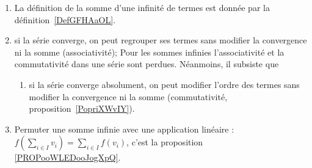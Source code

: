\begin{description}
\begin{enumerate}
    \item
        La définition de la somme d'une infinité de termes est donnée par la définition~\ref{DefGFHAaOL}.
  \item
      si la série converge, on peut regrouper ses termes sans modifier la convergence ni la somme (associativité);
    Pour les sommes infinies l'associativité et la commutativité dans une série sont perdues. Néanmoins, il subsiste que
  \begin{enumerate}
  \item
      si la série converge absolument, on peut modifier l'ordre des termes sans modifier la convergence ni la somme (commutativité, proposition~\ref{PopriXWvIY}).
  \end{enumerate}
  \item Permuter une somme infinie avec une application linéaire : \( f(\sum_{i\in I}v_i)=\sum_{i\in I}f(v_i)\), c'est la proposition \ref{PROPooWLEDooJogXpQ}.
        \end{enumerate}
\end{description}
